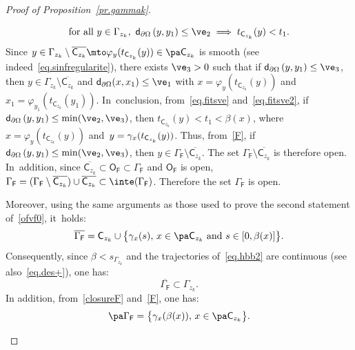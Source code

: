 \begin{proof}[Proof of Proposition~\ref{pr.gammak}]
\begin{enumerate}
\begin{equation}
\text{for all } y\in \Gamma_{z_k},\ \mathsf d_{\partial \Omega}\left(y,y_1\right)\leq \ve_2 \implies t_{\mathsf C_{z_k}}(y)<t_1.
\end{equation}
Since $y\in \Gamma_{z_k}\setminus \overline{\mathsf C_{z_k}}\mto \varphi_{y}(t_{\mathsf C_{z_k}}(y))\in \pa \mathsf C_{z_k}$ is smooth (see indeed~\eqref{eq.sinfregularite}), there exists $\ve_3>0$ such that if $\mathsf d_{\partial \Omega}\left(y,y_1\right)\le \ve_3$, then $y\in \Gamma_{z_k}\setminus \overline{\mathsf C_{z_k}} $ and $\mathsf d_{\partial \Omega}(x,x_1)\le \ve_1$ with $x=\varphi_{y}(t_{\mathsf C_{z_k}}(y))$ and $x_1=\varphi_{y_1}(t_{\mathsf C_{z_k}}(y_1))$. In~conclusion, from~\eqref{eq.fitsve} and~\eqref{eq.fitsve2}, if $\mathsf d_{\partial \Omega}\left(y,y_1\right)\le \min(\ve_2,\ve_3)$, then $t_{\mathsf C_{z_k}}(y)<t_1<\beta(x)$, where $x=\varphi_{y}(t_{\mathsf C_{z_k}}(y))$ and~$y=\nobreak\gamma_x(t_{\mathsf C_{z_k}}(y))$. Thus, from~\eqref{F}, if
$\mathsf d_{\partial \Omega}\left(y,y_1\right)\le \min(\ve_2,\ve_3)$, then
$y\in \Gamma_{\mathsf F}\setminus \overline{ \mathsf C_{z_k}}$. The set $\Gamma_{\mathsf F}\setminus \overline{ \mathsf C_{z_k}}$ is therefore open. In~addition, since $\overline{\mathsf C_{z_k}}\subset \mathsf O_{\mathsf F}\subset \Gamma_{\mathsf F}$ and $ \mathsf O_{\mathsf F}$ is open, $\Gamma_{\mathsf F}=(\Gamma_{\mathsf F}\setminus \overline {\mathsf C_{z_k}})\cup \overline{\mathsf C_{z_k}}\subset\inte(\Gamma_{\mathsf F})$. Therefore the set $\Gamma_{\mathsf F}$ is open.

Moreover, using the same arguments as those used to prove the second statement of~\eqref{ofvf0}, it~holds:
\begin{equation}\label{closureF}
\overline{ \Gamma_{\mathsf F}}= \mathsf C_{z_k} \cup \big \{ \gamma_x(s), \, x\in \pa \mathsf C_{z_k} \text{ and } s\in [0,\beta(x)]\big \}.
\end{equation}
Consequently, since $\beta< s_{\Gamma_{z_k}}$ and the trajectories of~\eqref{eq.hbb2} are continuous (see also~\eqref{eq.des+}), one has:
\[
\overline{ \Gamma_{\mathsf F}}\subset \Gamma_{z_k}.
\]
In addition, from~\eqref{closureF} and~\eqref{F}, one has:
\begin{equation}\label{boundaryF}
\pa \Gamma_{\mathsf F}=\big \{ \gamma_x(\beta(x)), \, x\in \pa \mathsf C_{z_k} \big \}.
\end{equation}


\end{enumerate}
\end{proof}
